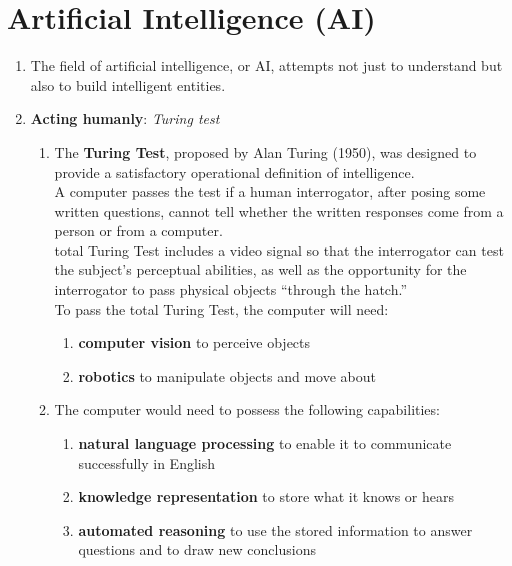 \chapter{Artificial Intelligence (AI) \cite{aci-1}}

\begin{enumerate}[itemsep=0.2cm]
    \item The field of artificial intelligence, or AI, attempts not just to understand but also to build intelligent entities. 

    \item \textbf{Acting humanly}: \textit{Turing test}
    \begin{enumerate}
        \item The \textbf{Turing Test}, proposed by Alan Turing (1950), was designed to provide a satisfactory operational definition of intelligence.\\
        A computer passes the test if a human interrogator, after posing some written questions, cannot tell whether the written responses come from a person or from a computer.\\
        total Turing Test includes a video signal so that the interrogator can test the subject’s perceptual abilities, as well as the opportunity for the interrogator to pass physical objects “through the hatch.”\\
        To pass the total Turing Test, the computer will need:
        \begin{enumerate}
            \item \textbf{computer vision} to perceive objects

            \item \textbf{robotics} to manipulate objects and move about
        \end{enumerate}

        \item The computer would need to possess the following capabilities: 
        \begin{enumerate}
            \item \textbf{natural language processing} to enable it to communicate successfully in English

            \item \textbf{knowledge representation} to store what it knows or hears

            \item \textbf{automated reasoning} to use the stored information to answer questions and to draw new conclusions


\end{enumerate}
\end{enumerate}
\end{enumerate}
